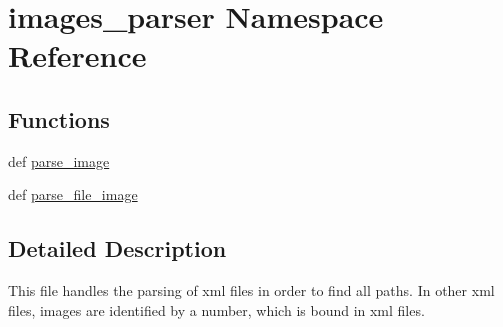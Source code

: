 \hypertarget{namespaceimages__parser}{\section{images\-\_\-parser \-Namespace \-Reference}
\label{namespaceimages__parser}
}
\subsection*{\-Functions}
\begin{DoxyCompactItemize}
\item 
def \hyperlink{namespaceimages__parser_a53ce946b0b782dbe0ddfae847a7c4779}{parse\-\_\-image}
\item 
def \hyperlink{namespaceimages__parser_a015beb8e8eab0e7427bc23a472f4a0e3}{parse\-\_\-file\-\_\-image}
\end{DoxyCompactItemize}


\subsection{\-Detailed \-Description}
\begin{DoxyVerb}
This file handles the parsing of xml files in order to find all paths.
In other xml files, images are identified by a number, which is bound
in xml files.
\end{DoxyVerb}
 

